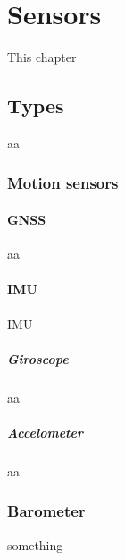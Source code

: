 \chapter{Sensors}
This chapter
\section{Types}
    aa
    \subsection{Motion sensors}
        \subsubsection{GNSS}
            aa
        \subsubsection{IMU}
            IMU
            \paragraph{Giroscope}
                aa
            \paragraph{Accelometer}
                aa
    \subsection{Barometer}
        something